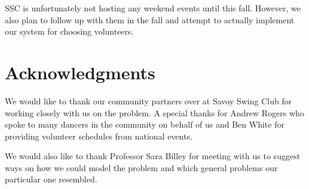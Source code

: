 \documentclass[11pt]{article}
\theoremstyle{definition}
\begin{document}
\begin{multicols}{2}
SSC is unfortunately not hosting any weekend events until this fall.
However, we also plan to follow up with them in the fall and attempt to actually implement our system for choosing volunteers.

\section{Acknowledgments}
We would like to thank our community partners over at Savoy Swing Club for working closely with us on the problem. A special thanks for Andrew Rogers who spoke to many dancers in the community on behalf of us and Ben White for providing volunteer schedules from national events.

We would also like to thank Professor Sara Billey for meeting with us to suggest ways
on how we could model the problem and which general problems our particular one resembled.


\end{multicols}
\end{document}
